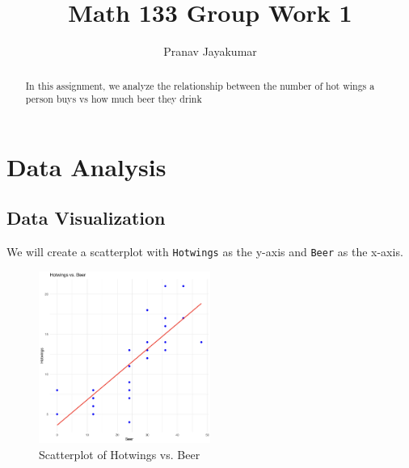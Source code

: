 \documentclass{article}
\title{Math 133 Group Work 1}
\author{Pranav Jayakumar}
\theoremstyle{mytheoremstyle}
\theoremstyle{mytheoremstyle}
\theoremstyle{myproblemstyle}
\begin{document}
    \maketitle
    \begin{abstract} In this assignment, we analyze the relationship between the number of hot wings a person buys vs how much beer they drink \end{abstract}
    \vspace{0.25in}
    \section{Data Analysis}
      \vspace{0.1in}
      \subsection{Data Visualization}
      We will create a scatterplot with \verb|Hotwings| as the y-axis and \verb|Beer| as the x-axis. 
      \vspace{0.1in}
      \begin{figure}[h]
        \begin{center}
          \includegraphics[width=0.5\textwidth]{hotwings_vs_beer.png}
        \end{center}
        \caption{Scatterplot of Hotwings vs. Beer}\label{fig:}
      \end{figure}
      \vspace{0.25in}
\end{document}
